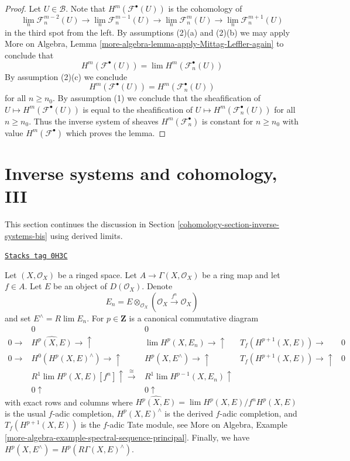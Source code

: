 \begin{proof}
Let $U \in \mathcal{B}$. Note that $H^m(\mathcal{F}^\bullet(U))$ is the
cohomology of
$$
\lim_n \mathcal{F}_n^{m - 2}(U) \to
\lim_n \mathcal{F}_n^{m - 1}(U) \to
\lim_n \mathcal{F}_n^m(U) \to
\lim_n \mathcal{F}_n^{m + 1}(U)
$$
in the third spot from the left. By assumptions (2)(a) and (2)(b)
we may apply
More on Algebra, Lemma \ref{more-algebra-lemma-apply-Mittag-Leffler-again}
to conclude that
$$
H^m(\mathcal{F}^\bullet(U)) = \lim H^m(\mathcal{F}_n^\bullet(U))
$$
By assumption (2)(c) we conclude
$$
H^m(\mathcal{F}^\bullet(U)) = H^m(\mathcal{F}_n^\bullet(U))
$$
for all $n \geq n_0$. By assumption (1) we conclude that the sheafification of
$U \mapsto H^m(\mathcal{F}^\bullet(U))$ is equal to the sheafification
of $U \mapsto H^m(\mathcal{F}_n^\bullet(U))$ for all $n \geq n_0$.
Thus the inverse system of sheaves $H^m(\mathcal{F}_n^\bullet)$ is
constant for $n \geq n_0$ with value $H^m(\mathcal{F}^\bullet)$ which
proves the lemma.
\end{proof}

\section{Inverse systems and cohomology, III}
\label{cohomology-section-inverse-systems-tri}
This section continues the discussion in
Section \ref{cohomology-section-inverse-systems-bis}
using derived limits.

\begin{lemma}
\label{cohomology-lemma-formal-functions-principal}
\href{https://stacks.math.columbia.edu/tag/0H3C}{\texttt{Stacks tag 0H3C}}

Let $(X, \mathcal{O}_X)$ be a ringed space. Let $A \to \Gamma(X, \mathcal{O}_X)$
be a ring map and let $f \in A$. Let $E$ be an object of $D(\mathcal{O}_X)$.
Denote
$$
E_n = E \otimes_{\mathcal{O}_X} (\mathcal{O}_X \xrightarrow{f^n} \mathcal{O}_X)
$$
and set $E^\wedge = R\lim E_n$. For $p \in \mathbf{Z}$
is a canonical commutative diagram
$$
\begin{array}{ccccc} & 0 & 0 &  &  \\ 0 \longrightarrow & \widehat{H^p(X, E)} \longrightarrow\uparrow & \lim H^p(X, E_n) \longrightarrow\uparrow & T_f(H^{p + 1}(X, E)) \longrightarrow & 0 \\ 0 \longrightarrow & H^0(H^p(X, E)^\wedge) \longrightarrow\uparrow & H^p(X, E^\wedge) \longrightarrow\uparrow & T_f(H^{p + 1}(X, E)) \longrightarrow\uparrow & 0 \\  & R^1\lim H^p(X, E)[f^n] \uparrow\overset{\cong}{\longrightarrow} & R^1\lim H^{p - 1}(X, E_n) \uparrow &  &  \\  & 0 \uparrow & 0 \uparrow &  & \end{array}
$$
with exact rows and columns
where $\widehat{H^p(X, E)} = \lim H^p(X, E)/f^n H^p(X, E)$ is the usual
$f$-adic completion, $H^p(X, E)^\wedge$ is the derived $f$-adic completion,
and $T_f(H^{p + 1}(X, E))$ is the $f$-adic Tate module, see
More on Algebra, Example
\ref{more-algebra-example-spectral-sequence-principal}.
Finally, we have $H^p(X, E^\wedge) = H^p(R\Gamma(X, E)^\wedge)$.
\end{lemma}

